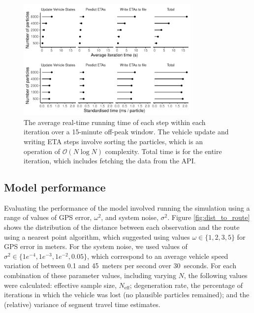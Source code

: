 \begin{figure}[tb]
    \centering
    \includegraphics[width=0.8\textwidth]{figures/04_model_results_timing.pdf}
    \caption{
        The average real-time running time of each step within each iteration
        over a 15-minute off-peak window.
        The vehicle update and writing ETA steps involve sorting the particles,
        which is an operation of $\mathcal{O}(N\log N)$ complexity.
        Total time is for the entire iteration, which includes fetching the data from the API.
    }
    \label{fig:timings}
\end{figure}




\subsection{Model performance}
\label{sec:model_perf}


Evaluating the performance of the model involved
running the simulation using a range of values of GPS error, $\omega^2$,
and system noise, $\sigma^2$.
Figure \ref{fig:dist_to_route} shows the distribution of the distance
between each observation and the route using a nearest point algorithm,
which suggested using values $\omega \in \{1,2,3,5\}$ for GPS error in meters.
For the system noise, we used values of $\sigma^2\in \{1e^{-4},1e^{-3},1e^{-2},0.05\}$,
which correspond to an average vehicle speed variation of between 0.1 and 45~meters per second
over 30~seconds.
For each combination of these parameter values, including varying $N$,
the following values were calculated:
effective sample size, $N_\text{eff}$;
degeneration rate, the percentage of iterations in which the vehicle was lost
(no plausible particles remained);
and the (relative) variance of segment travel time estimates.


